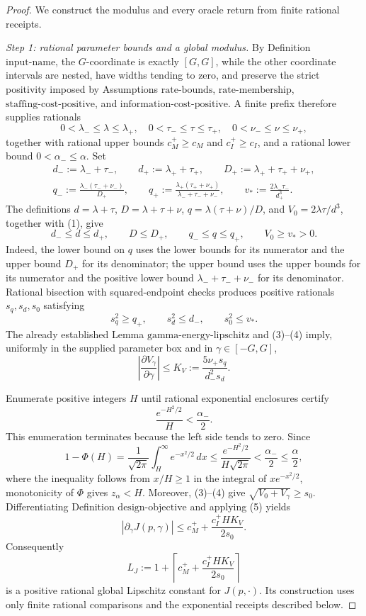 \documentclass{article}
\begin{document}
\begin{proof}
We construct the modulus and every oracle return from finite rational receipts.

\emph{Step 1: rational parameter bounds and a global modulus.}
By Definition \(\mathrm{input\mbox{-}name}\), the \(G\)-coordinate is exactly \([G,G]\), while the other coordinate intervals are nested, have widths tending to zero, and preserve the strict positivity imposed by Assumptions \(\mathrm{rate\mbox{-}bounds}\), \(\mathrm{rate\mbox{-}membership}\), \(\mathrm{staffing\mbox{-}cost\mbox{-}positive}\), and \(\mathrm{information\mbox{-}cost\mbox{-}positive}\).  A finite prefix therefore supplies rationals
\[
 0<\lambda_-\leq\lambda\leq\lambda_+,
 \quad 0<\tau_-\leq\tau\leq\tau_+,
 \quad 0<\nu_-\leq\nu\leq\nu_+,
\tag{1}
\]
together with rational upper bounds \(c_M^+\geq c_M\) and \(c_I^+\geq c_I\), and a rational lower bound \(0<\alpha_-\leq\alpha\).  Set
\[
 \begin{gathered}
 d_-:=\lambda_-+\tau_-,\qquad d_+:=\lambda_++\tau_+,
 \qquad D_+:=\lambda_++\tau_++\nu_+,\\
 q_-:=\frac{\lambda_-(\tau_-+\nu_-)}{D_+},\qquad
 q_+:=\frac{\lambda_+(\tau_++\nu_+)}{\lambda_-+\tau_-+\nu_-},
 \qquad v_*:=\frac{2\lambda_-\tau_-}{d_+^3}.
 \end{gathered}
\tag{2}
\]
The definitions \(d=\lambda+\tau\), \(D=\lambda+\tau+\nu\), \(q=\lambda(\tau+\nu)/D\), and \(V_0=2\lambda\tau/d^3\), together with (1), give
\[
 d_-\leq d\leq d_+,
 \qquad D\leq D_+,
 \qquad q_-\leq q\leq q_+,
 \qquad V_0\geq v_*>0.
\tag{3}
\]
Indeed, the lower bound on \(q\) uses the lower bounds for its numerator and the upper bound \(D_+\) for its denominator; the upper bound uses the upper bounds for its numerator and the positive lower bound \(\lambda_-+\tau_-+\nu_-\) for its denominator.  Rational bisection with squared-endpoint checks produces positive rationals \(s_q,s_d,s_0\) satisfying
\[
 s_q^2\geq q_+,
 \qquad s_d^2\leq d_-,
 \qquad s_0^2\leq v_*.
\tag{4}
\]
The already established Lemma \(\mathrm{gamma\mbox{-}energy\mbox{-}lipschitz}\) and (3)--(4) imply, uniformly in the supplied parameter box and in \(\gamma\in[-G,G]\),
\[
 \left|\frac{\partial V_\gamma}{\partial\gamma}\right|
 \leq K_V:=\frac{5\nu_+s_q}{d_-^2s_d}.
\tag{5}
\]

Enumerate positive integers \(H\) until rational exponential enclosures certify
\[
 \frac{e^{-H^2/2}}{H}<\frac{\alpha_-}{2}.
\tag{6}
\]
This enumeration terminates because the left side tends to zero.  Since
\[
 1-\Phi(H)
 =\frac1{\sqrt{2\pi}}\int_H^\infty e^{-x^2/2}\,dx
 \leq\frac{e^{-H^2/2}}{H\sqrt{2\pi}}
 <\frac{\alpha_-}{2}\leq\frac\alpha2,
\tag{7}
\]
where the inequality follows from \(x/H\geq1\) in the integral of \(xe^{-x^2/2}\), monotonicity of \(\Phi\) gives \(z_\alpha<H\).  Moreover, (3)--(4) give \(\sqrt{V_0+V_\gamma}\geq s_0\).  Differentiating Definition \(\mathrm{design\mbox{-}objective}\) and applying (5) yields
\[
 |\partial_\gamma J(p,\gamma)|
 \leq c_M^++\frac{c_I^+HK_V}{2s_0}.
\tag{8}
\]
Consequently
\[
 L_J:=1+\left\lceil c_M^++\frac{c_I^+HK_V}{2s_0}\right\rceil
\tag{9}
\]
is a positive rational global Lipschitz constant for \(J(p,\cdot)\).  Its construction uses only finite rational comparisons and the exponential receipts described below.


\end{proof}
\end{document}
